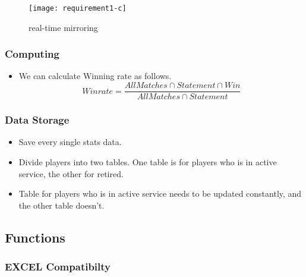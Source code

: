 \documentclass[conference,compsoc, twocolumn]{IEEEtran}
\begin{document}
\begin{figure}[H]
\centering\texttt{[image: requirement1-c]}
\caption{real-time mirroring}
\end{figure}

\subsubsection{Computing}

\begin{itemize}
\item We can calculate Winning rate as follows. 
\begin{equation} \label{eq:winrate} Winrate = \frac{All Matches\cap Statement\cap Win}{All Matches\cap Statement} \end{equation}
\end{itemize}



\subsubsection{Data Storage}
\begin{itemize}
\item Save every single stats data.
\item Divide players  into two tables. One table is for players who is in active service, the other for retired.
\item Table for players who is in active service needs to be updated constantly, and the other table doesn’t.
\end{itemize}



\subsection{Functions}

\subsubsection{EXCEL Compatibilty}
\end{document}
